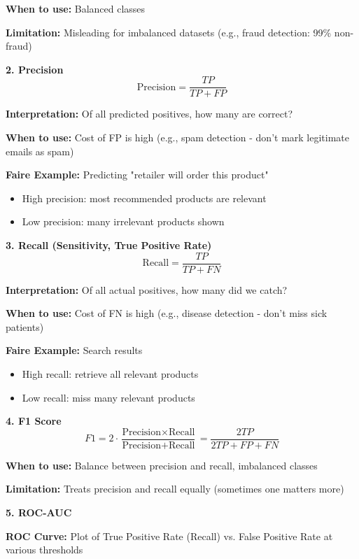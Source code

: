 \documentclass[11pt,letterpaper]{article}
\begin{document}
\textbf{When to use:} Balanced classes

\textbf{Limitation:} Misleading for imbalanced datasets (e.g., fraud detection: 99\% non-fraud)

\textbf{2. Precision}
\begin{equation}
\text{Precision} = \frac{TP}{TP + FP}
\end{equation}

\textbf{Interpretation:} Of all predicted positives, how many are correct?

\textbf{When to use:} Cost of FP is high (e.g., spam detection - don't mark legitimate emails as spam)

\textbf{Faire Example:} Predicting "retailer will order this product"
\begin{itemize}
    \item High precision: most recommended products are relevant
    \item Low precision: many irrelevant products shown
\end{itemize}

\textbf{3. Recall (Sensitivity, True Positive Rate)}
\begin{equation}
\text{Recall} = \frac{TP}{TP + FN}
\end{equation}

\textbf{Interpretation:} Of all actual positives, how many did we catch?

\textbf{When to use:} Cost of FN is high (e.g., disease detection - don't miss sick patients)

\textbf{Faire Example:} Search results
\begin{itemize}
    \item High recall: retrieve all relevant products
    \item Low recall: miss many relevant products
\end{itemize}

\textbf{4. F1 Score}
\begin{equation}
F1 = 2 \cdot \frac{\text{Precision} \times \text{Recall}}{\text{Precision} + \text{Recall}} = \frac{2TP}{2TP + FP + FN}
\end{equation}

\textbf{When to use:} Balance between precision and recall, imbalanced classes

\textbf{Limitation:} Treats precision and recall equally (sometimes one matters more)

\textbf{5. ROC-AUC}

\textbf{ROC Curve:} Plot of True Positive Rate (Recall) vs. False Positive Rate at various thresholds
\end{document}
